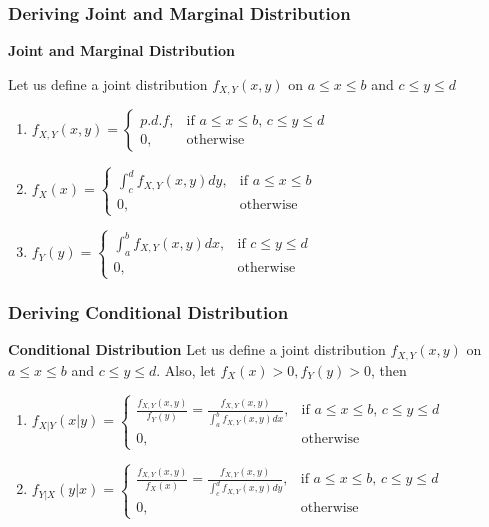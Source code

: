 \documentclass{beamer}
\begin{document}
\begin{frame}
\frametitle{Deriving Joint and Marginal Distribution}
\textbf{Joint and Marginal Distribution}

Let us define a joint distribution $f_{X,Y}(x,y)$ on $a\le x \le b$ and $c\le y \le d$
\begin{enumerate}
\item $f_{X,Y}(x,y) =\begin{cases}
			p.d.f, & \text{if $a\le x \le b$, $c\le y \le d$}\\
            0, & \text{otherwise}
		 \end{cases}$
\item $f_X(x) =\begin{cases}
			\int_c^d f_{X,Y}(x,y)dy, & \text{if $a\le x \le b$}\\
            0, & \text{otherwise}
		 \end{cases}$


\item $f_Y(y) =\begin{cases}
			\int_a^b f_{X,Y}(x,y)dx, & \text{if $c\le y \le d$ }\\
            0, & \text{otherwise}
		 \end{cases}$

\end{enumerate}

\end{frame}


\begin{frame}
\frametitle{Deriving Conditional Distribution}
\textbf{Conditional Distribution}
Let us define a joint distribution $f_{X,Y}(x,y)$ on $a\le x \le b$ and $c\le y \le d$. Also, let $f_X(x)>0, f_Y(y) >0$, then
\begin{enumerate}
\item $f_{X|Y}(x|y) =\begin{cases}
			\frac{f_{X,Y}(x,y)}{f_Y(y)} = \frac{f_{X,Y}(x,y)}{\int_a^b f_{X,Y}(x,y)dx}, & \text{if $a\le x \le b$, $c\le y \le d$}\\
            0, & \text{otherwise}
		 \end{cases}$
\item $f_{Y|X}(y|x) =\begin{cases}
			\frac{f_{X,Y}(x,y)}{f_X(x)} = \frac{f_{X,Y}(x,y)}{\int_c^d f_{X,Y}(x,y)dy}, & \text{if $a\le x \le b$, $c\le y \le d$}\\
            0, & \text{otherwise}
		 \end{cases}$

\end{enumerate}
\end{frame}
\end{document}
